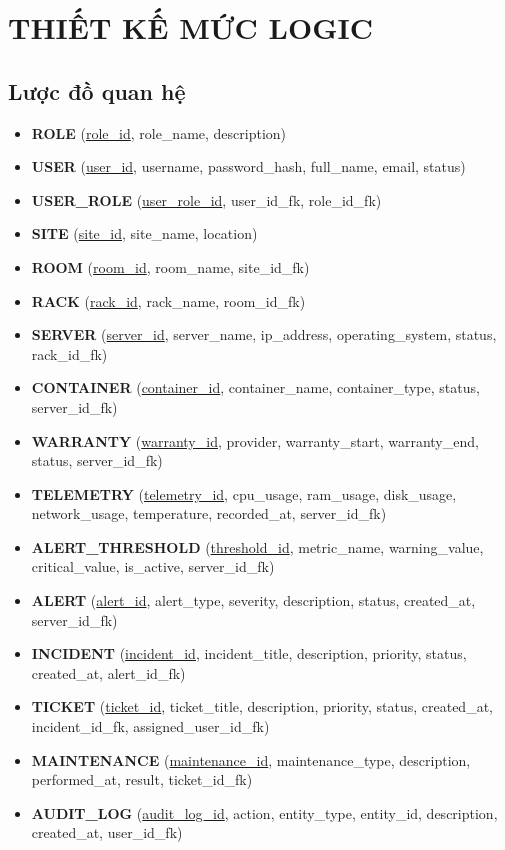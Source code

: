 \chapter{THIẾT KẾ MỨC LOGIC}

\section{Lược đồ quan hệ}

\begin{itemize}
    \item \textbf{ROLE} (\underline{role\_id}, role\_name, description)
    \item \textbf{USER} (\underline{user\_id}, username, password\_hash, full\_name, email, status)
    \item \textbf{USER\_ROLE} (\underline{user\_role\_id}, user\_id\_fk, role\_id\_fk)
    \item \textbf{SITE} (\underline{site\_id}, site\_name, location)
    \item \textbf{ROOM} (\underline{room\_id}, room\_name, site\_id\_fk)
    \item \textbf{RACK} (\underline{rack\_id}, rack\_name, room\_id\_fk)
    \item \textbf{SERVER} (\underline{server\_id}, server\_name, ip\_address, operating\_system, status, rack\_id\_fk)
    \item \textbf{CONTAINER} (\underline{container\_id}, container\_name, container\_type, status, server\_id\_fk)
    \item \textbf{WARRANTY} (\underline{warranty\_id}, provider, warranty\_start, warranty\_end, status, server\_id\_fk)
    \item \textbf{TELEMETRY} (\underline{telemetry\_id}, cpu\_usage, ram\_usage, disk\_usage, network\_usage, temperature, recorded\_at, server\_id\_fk)
    \item \textbf{ALERT\_THRESHOLD} (\underline{threshold\_id}, metric\_name, warning\_value, critical\_value, is\_active, server\_id\_fk)
    \item \textbf{ALERT} (\underline{alert\_id}, alert\_type, severity, description, status, created\_at, server\_id\_fk)
    \item \textbf{INCIDENT} (\underline{incident\_id}, incident\_title, description, priority, status, created\_at, alert\_id\_fk)
    \item \textbf{TICKET} (\underline{ticket\_id}, ticket\_title, description, priority, status, created\_at, incident\_id\_fk, assigned\_user\_id\_fk)
    \item \textbf{MAINTENANCE} (\underline{maintenance\_id}, maintenance\_type, description, performed\_at, result, ticket\_id\_fk)
    \item \textbf{AUDIT\_LOG} (\underline{audit\_log\_id}, action, entity\_type, entity\_id, description, created\_at, user\_id\_fk)
\end{itemize}

